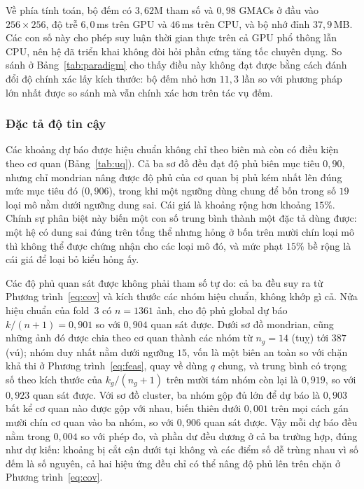 \documentclass[preprint,12pt]{elsarticle}
\begin{document}
Về phía tính toán, bộ đếm có $3{,}62$M tham số và $0{,}98$ GMACs ở đầu vào $256\times256$, độ trễ $6{,}0$\,ms
trên GPU và $46$\,ms trên CPU, và bộ nhớ đỉnh $37{,}9$\,MB. Các con số này cho phép suy luận thời gian thực trên
cả GPU phổ thông lẫn CPU, nên hệ đã triển khai không đòi hỏi phần cứng tăng tốc chuyên dụng. So sánh ở
Bảng~\ref{tab:paradigm} cho thấy điều này không đạt được bằng cách đánh đổi độ chính xác lấy kích thước: bộ đếm
nhỏ hơn $11{,}3$ lần so với phương pháp lớn nhất được so sánh mà vẫn chính xác hơn trên tác vụ đếm.

\subsubsection{Đặc tả độ tin cậy}\label{sec:uq}
Các khoảng dự báo được hiệu chuẩn không chỉ theo biên mà còn có điều kiện theo cơ quan (Bảng~\ref{tab:uq}). Cả ba
sơ đồ đều đạt độ phủ biên mục tiêu $0{,}90$, nhưng chỉ mondrian nâng được độ phủ của cơ quan bị phủ kém nhất lên
đúng mức mục tiêu đó ($0{,}906$), trong khi một ngưỡng dùng chung để bốn trong số $19$ loại mô nằm dưới ngưỡng
dung sai. Cái giá là khoảng rộng hơn khoảng $15\%$. Chính sự phân biệt này biến một con số trung bình thành một
đặc tả dùng được: một hệ có dung sai đúng trên tổng thể nhưng hỏng ở bốn trên mười chín loại mô thì không thể được
chứng nhận cho các loại mô đó, và mức phạt $15\%$ bề rộng là cái giá để loại bỏ kiểu hỏng ấy.

Các độ phủ quan sát được không phải tham số tự do: cả ba đều suy ra từ Phương trình~\eqref{eq:cov} và kích thước
các nhóm hiệu chuẩn, không khớp gì cả. Nửa hiệu chuẩn của fold~3 có $n = 1361$ ảnh, cho độ phủ global dự báo
$k/(n+1) = 0{,}901$ so với $0{,}904$ quan sát được. Dưới sơ đồ mondrian, cũng những ảnh đó được chia theo cơ quan
thành các nhóm từ $n_g = 14$ (tuỵ) tới $387$ (vú); nhóm duy nhất nằm dưới ngưỡng $15$, vốn là một biên an toàn so
với chặn khả thi ở Phương trình~\eqref{eq:feas}, quay về dùng $q$ chung, và trung bình có trọng số theo kích thước
của $k_g/(n_g+1)$ trên mười tám nhóm còn lại là $0{,}919$, so với $0{,}923$ quan sát được. Với sơ đồ cluster, ba
nhóm gộp đủ lớn để dự báo là $0{,}903$ bất kể cơ quan nào được gộp với nhau, biến thiên dưới $0{,}001$ trên mọi
cách gán mười chín cơ quan vào ba nhóm, so với $0{,}906$ quan sát được. Vậy mỗi dự báo đều nằm trong $0{,}004$ so
với phép đo, và phần dư đều dương ở cả ba trường hợp, đúng như dự kiến: khoảng bị cắt cận dưới tại không và các
điểm số dễ trùng nhau vì số đếm là số nguyên, cả hai hiệu ứng đều chỉ có thể nâng độ phủ lên trên chặn ở
Phương trình~\eqref{eq:cov}.
\end{document}

